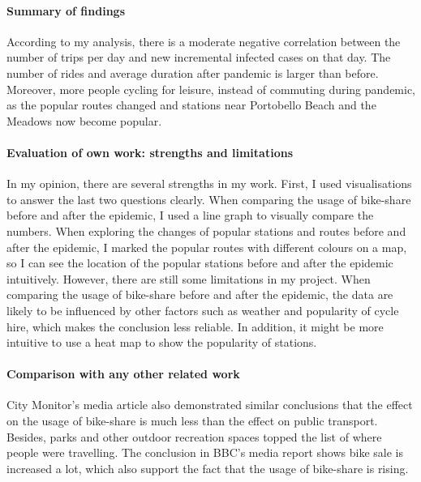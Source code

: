 \documentclass[11pt,a4paper]{article}
\begin{document}
\paragraph{Summary of findings}

According to my analysis, there is a moderate negative correlation between the number of trips per day and new incremental infected cases on that day. The number of rides and average duration after pandemic is larger than before. Moreover, more people cycling for leisure, instead of commuting during pandemic, as the popular routes changed and stations near Portobello Beach and the Meadows now become popular.

\paragraph{Evaluation of own work: strengths and limitations}

In my opinion, there are several strengths in my work. First, I used visualisations to answer the last two questions clearly. When comparing the usage of bike-share before and after the epidemic, I used a line graph to visually compare the numbers. When exploring the changes of popular stations and routes before and after the epidemic, I marked the popular routes with different colours on a map, so I can see the location of the popular stations before and after the epidemic intuitively. However, there are still some limitations in my project. When comparing the usage of bike-share before and after the epidemic, the data are likely to be influenced by other factors such as weather and popularity of cycle hire, which makes the conclusion less reliable. In addition, it might be more intuitive to use a heat map to show the popularity of stations.

\paragraph{Comparison with any other related work}

City Monitor’s media article also demonstrated similar conclusions that the effect on the usage of bike-share is much less than the effect on public transport. Besides, parks and other outdoor recreation spaces topped the list of where people were travelling. The conclusion in BBC’s media report shows bike sale is increased a lot, which also support the fact that the usage of bike-share is rising.

\end{document}
